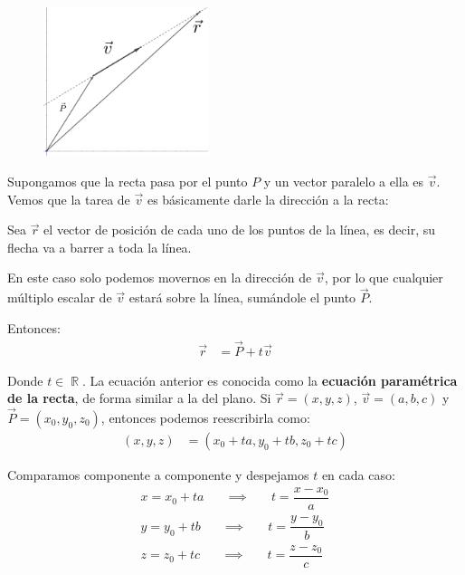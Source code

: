 \documentclass[12pt, fleqn]{report}                             %
\DeclareMathOperator \Space {\quad}                             %
\theoremstyle{break}                                            %
\DeclareMathOperator \Reals        {\mathbb{R}}                 %
\newcommand{\Wrap}[1]{\left( #1 \right)}                        %
\begin{document}
                \begin{figure}
                    \centering
                    \includegraphics[width=0.43\textwidth]{line}
                \end{figure}
            
                Supongamos que la recta pasa por el punto $P$ y un vector paralelo a ella es $\vec{v}$.
                Vemos que la tarea de $\vec{v}$ es básicamente darle la dirección a la recta:

                Sea $\vec{r}$ el vector de posición de cada uno de los puntos de la línea, es decir, su
                flecha va a barrer a toda la línea.

                En este caso solo podemos movernos en la dirección de
                $\vec{v}$, por lo que cualquier múltiplo escalar de $\vec{v}$ estará sobre la línea,
                sumándole el punto $\vec{P}$.

                Entonces:
                \begin{align}
                    \vec{r} &= \vec{P} + t\vec{v} \label{lineEquationGeneral}
                \end{align}

                \vspace{3em}
                
                Donde $t \in \Reals$. La ecuación anterior es conocida como la \textbf{ecuación paramétrica
                de la recta}, de forma similar a la del plano. Si $\vec{r} = (x, y, z)$, $\vec{v} = (a, b, c)$ y
                $\vec{P} = (x_0, y_0, z_0)$, entonces podemos reescribirla como:
                \begin{align*}
                    (x, y, z) &= \Wrap{x_0 + ta, y_0 + tb, z_0 + tc}
                \end{align*}
                
                Comparamos componente a componente y despejamos $t$ en cada caso:
                \begin{align*}
                    x = x_0 + ta \Space \implies \Space t = \dfrac{x - x_0}{a}  \\
                    y = y_0 + tb \Space \implies \Space t = \dfrac{y - y_0}{b}  \\
                    z = z_0 + tc \Space \implies \Space t = \dfrac{z - z_0}{c}
                \end{align*}
                
\end{document}

